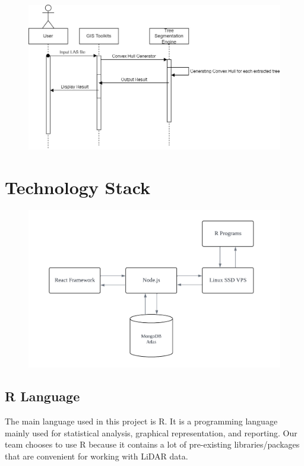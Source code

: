 \documentclass[a4paper, 12pt]{article}
\begin{document}
\begin{figure}[H]
    \centering
    \includegraphics[scale=0.4]{Images/sequenceDiagram-Convex Hull.jpg}
\end{figure}

\section{Technology Stack}

\begin{figure}[H]
    \centering
    \includegraphics[scale=0.6]{Images/tech.png}
\end{figure}


\subsection{R Language}

The main language used in this project is R. It is a programming language mainly used for statistical analysis, graphical representation, and reporting. Our team chooses to use R because it contains a lot of pre-existing libraries/packages that are convenient for working with LiDAR data. 
\end{document}
